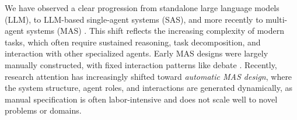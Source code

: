 We have observed a clear progression from standalone large language models (LLM), to LLM-based  single-agent systems (SAS), and more recently to multi-agent systems (MAS) \citep{ke2025surveyfrontiersllmreasoning}. This shift reflects the increasing complexity of modern tasks, which often require sustained reasoning, task decomposition, and interaction with other specialized agents. {Early MAS designs were largely manually constructed, with fixed interaction patterns like debate \citep{du2023improvingfactualityreasoning}. Recently, research attention has increasingly shifted toward \textit{automatic MAS design}, where the system structure, agent roles, and interactions are generated dynamically, as manual specification is often labor-intensive and does not scale well to novel problems or  domains.}





